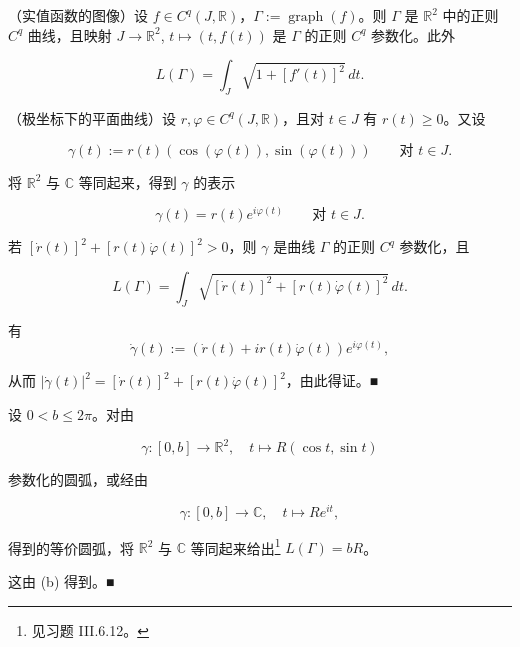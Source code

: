 \begin{example}

\begin{items}
\item

（实值函数的图像）设 $ f \in C^{q}(J,\mathbb{R}) $，$ \Gamma := \operatorname{graph}(f) $。则 $ \Gamma $ 是 $ \mathbb{R}^{2} $ 中的正则 $ C^{q} $ 曲线，且映射 $ J \to \mathbb{R}^{2} $, $ t \mapsto (t,f(t)) $ 是 $ \Gamma $ 的正则 $ C^{q} $ 参数化。此外

\[
L(\Gamma) = \int_J\sqrt{1 + [f'(t)]^{2}}\,dt .
\]
\item

（极坐标下的平面曲线）设 $ r,\varphi \in C^{q}(J,\mathbb{R}) $，且对 $ t \in J $ 有 $ r(t) \ge 0 $。又设

\[
\gamma(t) := r(t)(\cos(\varphi(t)),\sin(\varphi(t))) \qquad \text{对 } t \in J .
\]

将 $ \mathbb{R}^{2} $ 与 $ \mathbb{C} $ 等同起来，得到 $ \gamma $ 的表示

\[
\gamma(t) = r(t)e^{i\varphi(t)} \qquad \text{对 } t \in J .
\]

若 $ [\dot{r}(t)]^{2} + [r(t)\dot{\varphi}(t)]^{2} > 0 $，则 $ \gamma $ 是曲线 $ \Gamma $ 的正则 $ C^{q} $ 参数化，且

\[
L(\Gamma) = \int_J\sqrt{[\dot{r}(t)]^{2} + [r(t)\dot{\varphi}(t)]^{2}}\,dt .
\]

\proofhead
有
\[
\dot{\gamma}(t) := (\dot{r}(t) + ir(t)\dot{\varphi}(t))e^{i\varphi(t)} ,
\]

从而 $ |\dot{\gamma}(t)|^{2} = [\dot{r}(t)]^{2} + [r(t)\dot{\varphi}(t)]^{2} $，由此得证。\nobreak\hspace{0.35em}■

\item

设 $ 0 < b \le 2\pi $。对由

\[
\gamma : [0,b] \to \mathbb{R}^{2} , \quad t \mapsto R(\cos t,\sin t)
\]

参数化的圆弧，或经由

\[
\gamma : [0,b] \to \mathbb{C} , \quad t \mapsto Re^{it} ,
\]

得到的等价圆弧，将 $ \mathbb{R}^{2} $ 与 $ \mathbb{C} $ 等同起来给出\footnote{见习题 III.6.12。} $ L(\Gamma) = bR $。

\end{items}


\proofhead
这由 (b) 得到。\nobreak\hspace{0.35em}■


\end{example}
